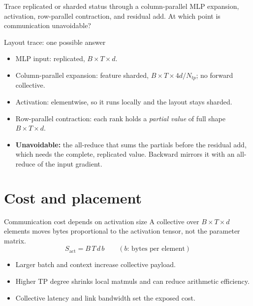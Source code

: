 \documentclass[handout]{beamer}
\begin{document}
{Trace replicated or sharded status through a column-parallel MLP expansion, activation, row-parallel contraction, and residual add. At which point is communication unavoidable?}

\begin{frame}{Layout trace: one possible answer}
  \begin{itemize}
      \setlength{\itemsep}{7pt}
    \item MLP input: replicated, $B\times T\times d$.
    \item Column-parallel expansion: feature sharded, $B\times T\times 4d/N_{tp}$; no forward collective.
    \item Activation: elementwise, so it runs locally and the layout stays sharded.
    \item Row-parallel contraction: each rank holds a \emph{partial value} of full shape $B\times T\times d$.
    \item \textbf{Unavoidable:} the all-reduce that sums the partials before the residual add, which needs the complete, replicated value. Backward mirrors it with an all-reduce of the input gradient.
  \end{itemize}
\end{frame}

\section{Cost and placement}

\begin{frame}{Communication cost depends on activation size}
  A collective over $B\times T\times d$ elements moves bytes proportional to the activation tensor, not the parameter matrix.
  \[
    S_{\text{act}}=B\,T\,d\,b
    \qquad (b\text{: bytes per element})
  \]
  \begin{itemize}
      \setlength{\itemsep}{7pt}
    \item Larger batch and context increase collective payload.
    \item Higher TP degree shrinks local matmuls and can reduce arithmetic efficiency.
    \item Collective latency and link bandwidth set the exposed cost.
  \end{itemize}
\end{frame}
\end{document}
